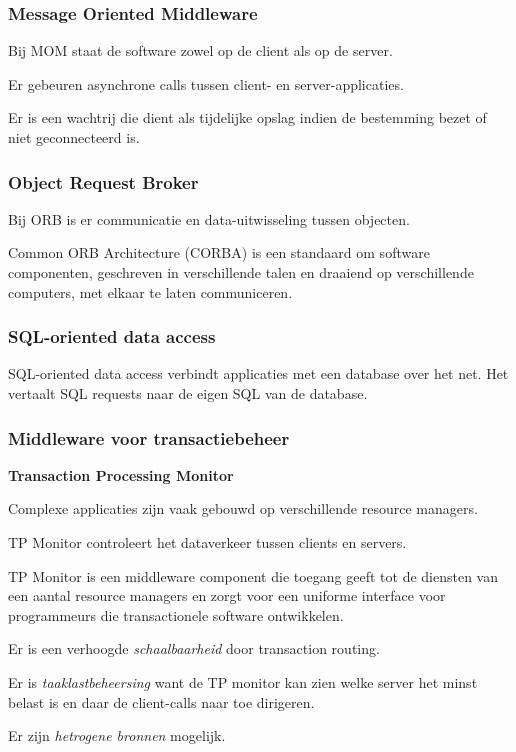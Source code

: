 \documentclass[a4paper,12pt]{article}
\begin{document}
\subsubsection{Message Oriented Middleware}
Bij MOM staat de software zowel op de client als op de server.

Er gebeuren asynchrone calls tussen client- en server-applicaties.

Er is een wachtrij die dient als tijdelijke opslag indien de bestemming bezet of niet geconnecteerd is.

\subsubsection{Object Request Broker}
Bij ORB is er communicatie en data-uitwisseling tussen objecten.

Common ORB Architecture (CORBA) is een standaard om software componenten, geschreven in verschillende talen en draaiend op verschillende computers, met elkaar te laten communiceren.

\subsubsection{SQL-oriented data access}
SQL-oriented data access verbindt applicaties met een database over het net.
Het vertaalt SQL requests naar de eigen SQL van de database.

\subsubsection{Middleware voor transactiebeheer}
\textbf{Transaction Processing Monitor}

Complexe applicaties zijn vaak gebouwd op verschillende resource managers.

TP Monitor controleert het dataverkeer tussen clients en servers.

TP Monitor is een middleware component die toegang geeft tot de diensten van een aantal resource managers en zorgt voor een uniforme interface voor programmeurs die transactionele software ontwikkelen.

Er is een verhoogde \textit{schaalbaarheid} door transaction routing.

Er is \textit{taaklastbeheersing} want de TP monitor kan zien welke server het minst belast is en daar de client-calls naar toe dirigeren.

Er zijn \textit{hetrogene bronnen} mogelijk.
\end{document}
